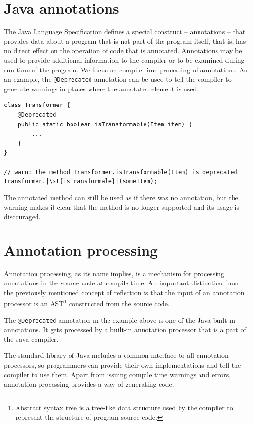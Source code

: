 \section{Java annotations}

The Java Language Specification defines a special construct – annotations – that provides data about a program that is not part of the program itself, that is, has no direct effect on the operation of code that is annotated. Annotations may be used to provide additional information to the compiler or to be examined during run-time of the program. We focus on compile time processing of annotations. As an example, the \texttt{@Deprecated} annotation can be used to tell the compiler to generate warnings in places where the annotated element is used.

\begin{verbatim}
class Transformer {
    @Deprecated
    public static boolean isTransformable(Item item) {
        ...
    }
}

// warn: the method Transformer.isTransformable(Item) is deprecated
Transformer.|\st{isTransformale}|(someItem);
\end{verbatim}

The annotated method can still be used as if there was no annotation, but the warning makes it clear that the method is no longer supported and its usage is discouraged.

\section{Annotation processing}

Annotation processing, as its name implies, is a mechanism for processing annotations in the source code at compile time. An important distinction from the previously mentioned concept of reflection is that the input of an annotation processor is an AST\footnote{Abstract syntax tree is a tree-like data structure used by the compiler to represent the structure of program source code.} constructed from the source code.

\n

The \texttt{@Deprecated} annotation in the example above is one of the Java built-in annotations. It gets processed by a built-in annotation processor that is a part of the Java compiler.

\n

The standard library of Java includes a common interface to all annotation processors, so programmers can provide their own implementations and tell the compiler to use them. Apart from issuing compile time warnings and errors, annotation processing provides a way of generating code.

